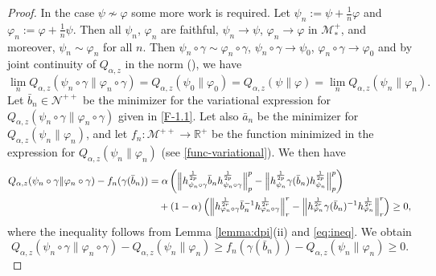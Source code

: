 \documentclass[12pt]{article}
\theoremstyle{definition}
\theoremstyle{remark}
\numberwithin{equation}{section}
\def\Me{\mathcal M}
\def\Ne{\mathcal N}
\def\ffi{\varphi}
\begin{document}
\begin{proof}
In the case $\psi\not\sim \ffi$ some more work is required. Let $\psi_n:=\psi+\frac1n \ffi$ and
$\ffi_n:=\ffi+\frac1n \psi$. Then all $\psi_n$, $\ffi_n$ are faithful,  $\psi_n\to \psi$, $\ffi_n\to \ffi$ in
$\Me_*^+$, {and} moreover,  $\psi_n\sim \ffi_n$ for all $n$. Then
$\psi_n\circ\gamma\sim \ffi_n\circ\gamma$, $\psi_n\circ\gamma\to \psi_0$,
$\ffi_n \circ \gamma\to \ffi_0$ and by joint continuity of $Q_{\alpha,z}$ {in the norm}
(\cite[Theorem 1(iv)]{kato2023onrenyi}), we have
\[
\lim_n
Q_{\alpha,z}(\psi_n\circ\gamma\|\ffi_n\circ\gamma)=Q_{\alpha,z}(\psi_0\|\ffi_0)
=Q_{\alpha,z}(\psi\|\ffi)=\lim_nQ_{\alpha,z}(\psi_n\|\ffi_n).
\]
Let $\bar b_{n}\in \Ne^{++}$ be the minimizer for the variational expression for
$Q_{\alpha,z}(\psi_n\circ\gamma\|\ffi_n\circ\gamma)$ {given in \eqref{F-1.1}.}
Let also $\bar a_n$ be the minimizer for $Q_{\alpha,z}(\psi_n\|\ffi_n)$, and let
$f_n:\Me^{++}\to \mathbb R^+$ be the function minimized in the expression for
$Q_{\alpha,z}(\psi_n\|\ffi_n)$ {(see \eqref{func-variational}).} We then have 
\begin{align*}
Q_{\alpha,z}(\psi_n\circ\gamma\|\ffi_n\circ\gamma)-f_n(\gamma(\bar
b_{n}))&=\alpha\left(\Big\|h_{\psi_n\circ\gamma}^{\frac1{2p}}\bar b_{n}
h_{\psi_n\circ\gamma}^{\frac1{2p}}\Big\|_p^p-\Big\|h_{\psi_n}^{1\over 2p}\gamma(\bar
b_n)h_{\psi_n}^{1\over 2p}\Big\|_p^p\right)\\
&\quad + (1-\alpha)\left(\Big\|h_{\ffi_n\circ\gamma}^{\frac1{2r}}\bar b_{n}^{-1}
h_{\ffi_n\circ\gamma}^{\frac1{2r}}\Big\|_r^r-\Big\|h_{\ffi_n}^{1\over 2r}\gamma(\bar
b_n)^{-1}h_{\ffi_n}^{1\over 2r}\Big\|_r^r\right)\ge 0,
\end{align*}
where the inequality follows from Lemma \ref{lemma:dpi}(ii) and \eqref{eq:ineq}. We
obtain
\begin{equation}\label{eq:qfn}
Q_{\alpha,z}(\psi_n\circ\gamma\|\ffi_n\circ\gamma)-Q_{\alpha,z}(\psi_n\|\ffi_n)\ge f_n(\gamma(\bar
b_{n}))-Q_{\alpha,z}(\psi_n\|\ffi_n)\ge 0.
\end{equation}


\end{proof}
\end{document}
